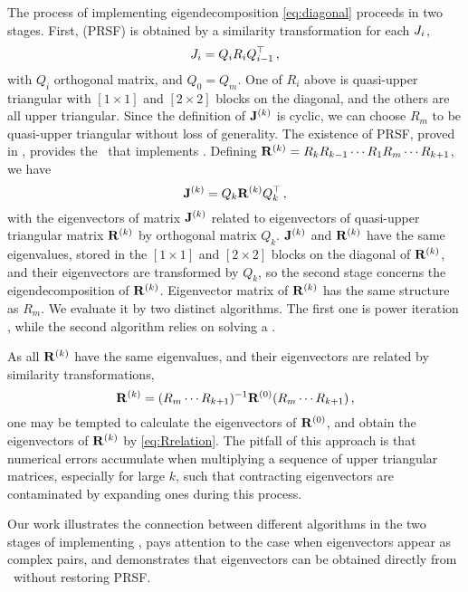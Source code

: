 \documentclass[final,leqno,onefignum,onetabnum]{siamltexmm}
\begin{document}
The process of implementing eigendecomposition \eqref{eq:diagonal}
proceeds in two stages. First, {\prsf} (PRSF) is
obtained by a similarity transformation for each $J_i$,
\begin{equation}
  \label{eq:prsf}
  \jMps_{i}=Q_{i}R_{i}Q_{i-1}^\top
  \,,
\end{equation}
with $Q_{i}$ orthogonal matrix, and $Q_{0}=Q_{m}$.
{One of $R_i$ above is quasi-upper triangular with
$[1\!\times\! 1]$ and $[2\!\times\! 2]$ blocks on the
diagonal, and the others are all upper triangular. Since the definition
of $\mathbf{J}^{(k)}$ is cyclic, we can choose $R_m$ to be
quasi-upper triangular without loss of generality.}
The existence of PRSF, proved in
, provides the \pqr\ that implements \psd.
Defining $\mathbf{R}^{(k)}=R_{k}R_{k-1}\cdots R_{1}R_{m}\cdots R_{k+1}$, we have
\begin{equation}
  \label{eq:pedrotation}
  \ps{\jMps}{k}=Q_{k}\ps{R}{k}Q_{k}^\top
  \,,
\end{equation}
with the eigenvectors of matrix $\mathbf{J}^{(k)}$ related to eigenvectors
of quasi-upper triangular matrix $\mathbf{R}^{(k)}$ by orthogonal matrix
$Q_{k}$. $\mathbf{J}^{(k)}$ and $\mathbf{R}^{(k)}$ have the same eigenvalues,
stored in the $[1\!\times\! 1]$ and $[2\!\times\! 2]$ blocks on the
diagonal of $\mathbf{R}^{(k)}$, and their eigenvectors are transformed by
$Q_{k}$, so the second stage concerns the eigendecomposition of
$\mathbf{R}^{(k)}$. Eigenvector matrix of $\mathbf{R}^{(k)}$ has the same structure as
$R_{m}$. We evaluate it by two distinct algorithms. The first one is power iteration
, while the
second algorithm relies on solving a \pse{}.

As all $\mathbf{R}^{(k)}$ have the same eigenvalues, and their eigenvectors are
related by similarity transformations,
\begin{equation}
  \label{eq:Rrelation}
  \ps{R}{k}=(R_{m}\cdots R_{k+1})^{-1}\ps{R}{0}(R_{m}\cdots R_{k+1})
  \,,
\end{equation}
one may be tempted to calculate the eigenvectors of $\mathbf{R}^{(0)}$, and
obtain the eigenvectors of $\mathbf{R}^{(k)}$ by \eqref{eq:Rrelation}. The
pitfall of this approach is that numerical errors accumulate when
multiplying a sequence of upper triangular matrices, especially for large
$k$, {such that contracting eigenvectors are contaminated by expanding
ones during this process}.

Our work illustrates the connection between different algorithms in the
two stages of implementing \ped, pays attention to the case when
eigenvectors appear as complex pairs, and demonstrates that eigenvectors
can be obtained directly from \pse\ without restoring PRSF.
\end{document}
